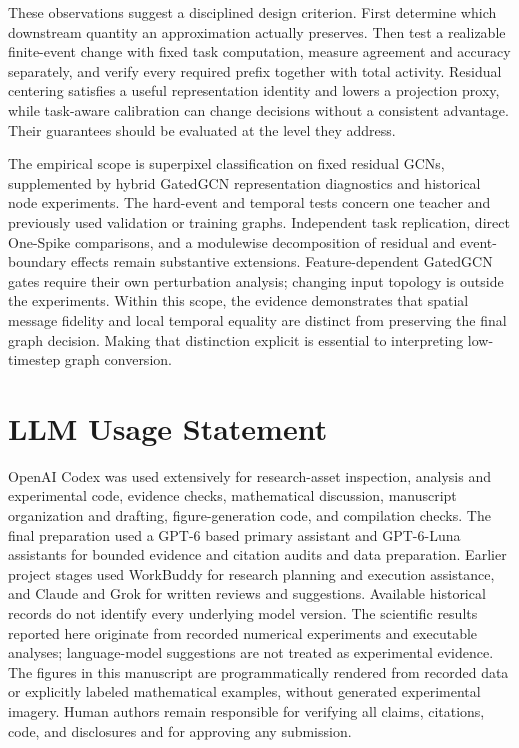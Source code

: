\documentclass[10pt,twocolumn,letterpaper]{article}
\begin{document}
These observations suggest a disciplined design criterion. First determine which downstream quantity an approximation actually preserves. Then test a realizable finite-event change with fixed task computation, measure agreement and accuracy separately, and verify every required prefix together with total activity. Residual centering satisfies a useful representation identity and lowers a projection proxy, while task-aware calibration can change decisions without a consistent advantage. Their guarantees should be evaluated at the level they address.

The empirical scope is superpixel classification on fixed residual GCNs, supplemented by hybrid GatedGCN representation diagnostics and historical node experiments. The hard-event and temporal tests concern one teacher and previously used validation or training graphs. Independent task replication, direct One-Spike comparisons, and a modulewise decomposition of residual and event-boundary effects remain substantive extensions. Feature-dependent GatedGCN gates require their own perturbation analysis; changing input topology is outside the experiments. Within this scope, the evidence demonstrates that spatial message fidelity and local temporal equality are distinct from preserving the final graph decision. Making that distinction explicit is essential to interpreting low-timestep graph conversion.

\clearpage
\section*{LLM Usage Statement}
OpenAI Codex was used extensively for research-asset inspection, analysis and experimental code, evidence checks, mathematical discussion, manuscript organization and drafting, figure-generation code, and compilation checks. The final preparation used a GPT-6 based primary assistant and GPT-6-Luna assistants for bounded evidence and citation audits and data preparation. Earlier project stages used WorkBuddy for research planning and execution assistance, and Claude and Grok for written reviews and suggestions. Available historical records do not identify every underlying model version. The scientific results reported here originate from recorded numerical experiments and executable analyses; language-model suggestions are not treated as experimental evidence. The figures in this manuscript are programmatically rendered from recorded data or explicitly labeled mathematical examples, without generated experimental imagery. Human authors remain responsible for verifying all claims, citations, code, and disclosures and for approving any submission.

{\small

}
\end{document}

